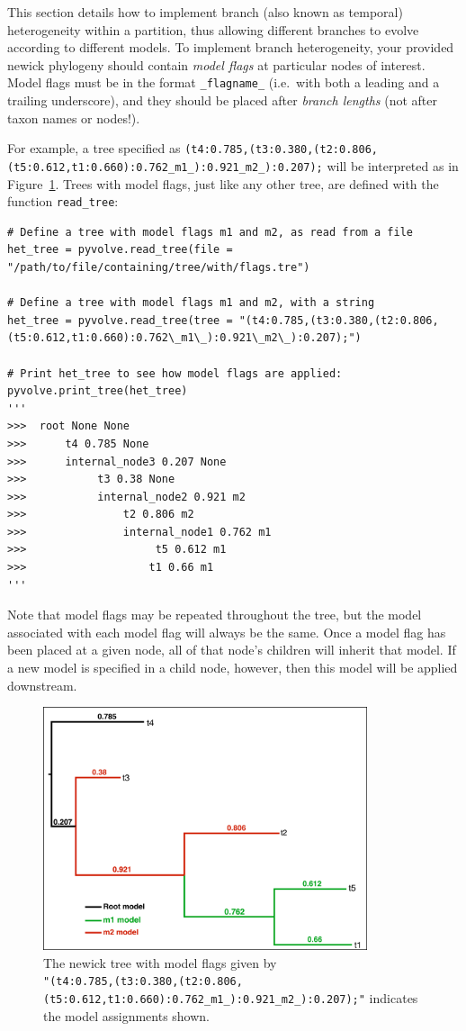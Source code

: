 \documentclass{article}
\newcommand{\code}[1]{\texttt{\small{#1}}}
\begin{document}
This section details how to implement branch (also known as temporal) heterogeneity within a partition, thus allowing different branches to evolve according to different models. To implement branch heterogeneity, your provided newick phylogeny should contain \emph{model flags} at particular nodes of interest. Model flags must be in the format \code{\_flagname\_} (i.e.\ with both a leading and a trailing underscore), and they should be placed after \emph{branch lengths} (not after taxon names or nodes!).

For example, a tree specified as  \texttt{\scriptsize{(t4:0.785,(t3:0.380,(t2:0.806,(t5:0.612,t1:0.660):0.762\_m1\_):0.921\_m2\_):0.207);}} will be interpreted as in Figure~\ref{fig:treeflags}. Trees with model flags, just like any other tree, are defined with the function \code{read\_tree}:
\begin{lstlisting}
# Define a tree with model flags m1 and m2, as read from a file
het_tree = pyvolve.read_tree(file = "/path/to/file/containing/tree/with/flags.tre")

# Define a tree with model flags m1 and m2, with a string
het_tree = pyvolve.read_tree(tree = "(t4:0.785,(t3:0.380,(t2:0.806,(t5:0.612,t1:0.660):0.762\_m1\_):0.921\_m2\_):0.207);")

# Print het_tree to see how model flags are applied:
pyvolve.print_tree(het_tree)
'''
>>>  root None None
>>>      t4 0.785 None
>>>      internal_node3 0.207 None
>>>           t3 0.38 None
>>>           internal_node2 0.921 m2
>>>               t2 0.806 m2
>>>               internal_node1 0.762 m1
>>>                    t5 0.612 m1
>>>                   t1 0.66 m1 
'''
\end{lstlisting}
Note that model flags may be repeated throughout the tree, but the model associated with each model flag will always be the same. Once a model flag has been placed at a given node, all of that node's children will inherit that model. If a new model is specified in a child node, however, then this model will be applied downstream.

\begin{figure}[htpb]%
	\includegraphics[width=3.75in]{treeflags_colors.pdf}
	\caption{\label{fig:treeflags} The newick tree with model flags given by \\ \texttt{\scriptsize{"(t4:0.785,(t3:0.380,(t2:0.806,(t5:0.612,t1:0.660):0.762\_m1\_):0.921\_m2\_):0.207);"}}
		indicates the model assignments shown.}
\end{figure}
\end{document}
